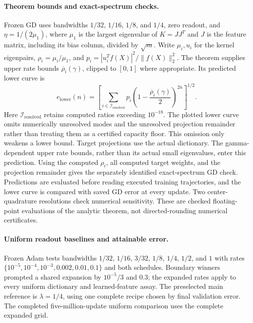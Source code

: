\paragraph{Theorem bounds and exact-spectrum checks.}
Frozen GD uses bandwidths $1/32$, $1/16$, $1/8$, and $1/4$, zero readout, and
$\eta=1/(2\mu_1)$, where $\mu_1$ is the largest eigenvalue of
$K=JJ^T$ and $J$ is the feature matrix, including its bias column, divided
by $\sqrt m$. Write $\mu_i,u_i$ for the kernel eigenpairs,
$\rho_i=\mu_i/\mu_1$, and
$p_i=|u_i^Tf(X)|^2/\|f(X)\|_2^2$.
The theorem supplies upper rate bounds $\overline\rho_i(\gamma)$,
clipped to $[0,1]$ where appropriate. Its predicted lower curve is
\begin{equation}
 e_{\mathrm{lower}}(n)
 =\left[\sum_{i\in\mathcal I_{\mathrm{resolved}}} p_i
       \left(1-\frac{\overline\rho_i(\gamma)}{2}\right)^{2n}\right]^{1/2}.
\end{equation}
Here $\mathcal I_{\mathrm{resolved}}$ retains computed ratios exceeding
$10^{-18}$. The plotted lower curve omits numerically unresolved modes and the
unresolved projection remainder rather than treating them as a certified
capacity floor. This omission only weakens a lower bound.
Target projections use the actual dictionary. The gamma-dependent upper
rate bounds, rather than its actual small eigenvalues, enter this prediction.
Using the computed $\rho_i$, all computed target weights, and the projection
remainder gives the separately identified exact-spectrum GD check.
Predictions are evaluated before reading executed
training trajectories, and the lower curve is compared with saved GD error
at every update. Two center-quadrature resolutions check numerical
sensitivity. These are checked floating-point evaluations of the analytic
theorem, not directed-rounding numerical certificates.

\paragraph{Uniform readout baselines and attainable error.}
Frozen Adam tests bandwidths $1/32$, $1/16$, $3/32$, $1/8$, $1/4$, $1/2$, and $1$ with rates
$\{10^{-5},10^{-4},10^{-3},0.002,0.01,0.1\}$ and both schedules.
Boundary winners prompted a shared expansion by $10^{-5}/3$ and $0.3$;
the expanded rates apply to every uniform dictionary and learned-feature
assay. The preselected main reference is $\lambda=1/4$, using one complete
recipe chosen by final validation error. The completed five-million-update
uniform comparison uses the complete expanded grid.

